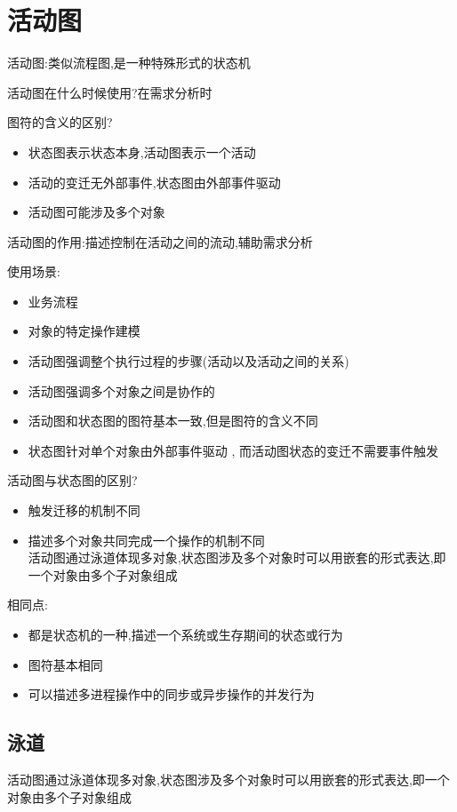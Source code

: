 \documentclass[UTF8,a4paper]{ctexart}
\begin{document}
\section{活动图}
活动图:类似流程图,是一种特殊形式的状态机



活动图在什么时候使用?在需求分析时

图符的含义的区别?
\begin{itemize}
  \item 状态图表示状态本身,活动图表示一个活动
  \item 活动的变迁无外部事件,状态图由外部事件驱动
  \item 活动图可能涉及多个对象
\end{itemize}

活动图的作用:描述控制在活动之间的流动,辅助需求分析

使用场景:
\begin{itemize}
  \item 业务流程
  \item 对象的特定操作建模
\end{itemize}

\begin{itemize}
  \item 活动图强调整个执行过程的步骤(活动以及活动之间的关系)
  \item 活动图强调多个对象之间是协作的
  \item 活动图和状态图的图符基本一致,但是图符的含义不同
  \item 状态图针对单个对象由外部事件驱动 , 而活动图状态的变迁不需要事件触发
\end{itemize}

活动图与状态图的区别?
\begin{itemize}
  \item 触发迁移的机制不同
  \item 描述多个对象共同完成一个操作的机制不同\\
  活动图通过泳道体现多对象,状态图涉及多个对象时可以用嵌套的形式表达,即一个对象由多个子对象组成
\end{itemize}

相同点:
\begin{itemize}
  \item 都是状态机的一种,描述一个系统或生存期间的状态或行为
  \item 图符基本相同
  \item 可以描述多进程操作中的同步或异步操作的并发行为
\end{itemize}

\subsection{泳道}
活动图通过泳道体现多对象,状态图涉及多个对象时可以用嵌套的形式表达,即一个对象由多个子对象组成
\end{document}
